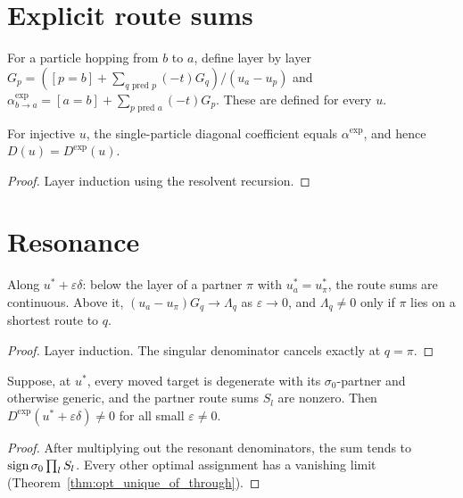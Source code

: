 \section{Explicit route sums}

\begin{definition}
  \label{def:Gr}
  \leanok
  For a particle hopping from $b$ to $a$, define layer by layer
  $G_p=([p=b]+\sum_{q\text{ pred }p}(-t)G_q)/(u_a-u_p)$ and $\alpha^{\exp}_{b\to a}=[a=b]+\sum_{p\text{ pred }a}(-t)G_p$.
  These are defined for every $u$.
\end{definition}

\begin{theorem}
  \label{thm:alphaRep_eq_alphaExp}
  \leanok
  For injective $u$, the single-particle diagonal coefficient equals $\alpha^{\exp}$, and hence $D(u)=D^{\exp}(u)$.
\end{theorem}
\begin{proof}
  \leanok
  Layer induction using the resolvent recursion.
\end{proof}

\section{Resonance}

\begin{theorem}
  \label{thm:gr_tendsto}
  \leanok
  Along $u^*+\varepsilon\delta$: below the layer of a partner $\pi$ with $u^*_a=u^*_\pi$, the route sums
  are continuous. Above it, $(u_a-u_\pi)G_q\to\Lambda_q$ as $\varepsilon\to0$, and $\Lambda_q\ne0$ only if
  $\pi$ lies on a shortest route to $q$.
\end{theorem}
\begin{proof}
  \leanok
  Layer induction. The singular denominator cancels exactly at $q=\pi$.
\end{proof}

\begin{theorem}
  \label{thm:DExp_eventually_ne}
  \leanok
  Suppose, at $u^*$, every moved target is degenerate with its $\sigma_0$-partner and otherwise generic,
  and the partner route sums $S_l$ are nonzero. Then $D^{\exp}(u^*+\varepsilon\delta)\neq0$ for all small
  $\varepsilon\ne0$.
\end{theorem}
\begin{proof}
  \leanok
  After multiplying out the resonant denominators, the sum tends to $\operatorname{sign}\sigma_0\prod_lS_l$. Every other
  optimal assignment has a vanishing limit (Theorem~\ref{thm:opt_unique_of_through}).
\end{proof}

